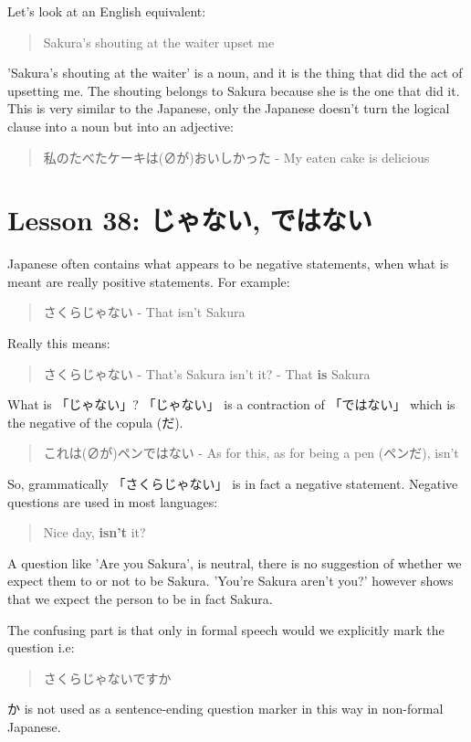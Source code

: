 \documentclass[11pt]{article}
\begin{document}
Let's look at an English equivalent:
\begin{quote}
Sakura's shouting at the waiter upset me
\end{quote}
'Sakura's shouting at the waiter' is a noun, and it is the thing that did the act of upsetting me. The shouting belongs to Sakura because she is the one that did it. This is very similar to the Japanese, only the Japanese doesn't turn the logical clause into a noun but into an adjective:
\begin{quote}
私のたべたケーキは(∅が)おいしかった - My eaten cake is delicious
\end{quote}

\section{Lesson 38: じゃない, ではない}
\label{sec:org830324f}
Japanese often contains what appears to be negative statements, when what is meant are really positive statements. For example:
\begin{quote}
さくらじゃない - That isn't Sakura
\end{quote}
Really this means:
\begin{quote}
さくらじゃない - That's Sakura isn't it? - That \textbf{is} Sakura
\end{quote}

What is 「じゃない」?  「じゃない」 is a contraction of 「ではない」 which is the negative of the copula (だ).
\begin{quote}
これは(∅が)ペンではない - As for this, as for being a pen (ペンだ), isn't
\end{quote}

So, grammatically 「さくらじゃない」 is in fact a negative statement. Negative questions are used in most languages:
\begin{quote}
Nice day, \textbf{isn't} it?
\end{quote}

A question like 'Are you Sakura', is neutral, there is no suggestion of whether we expect them to or not to be Sakura. 'You're Sakura aren't you?' however shows that we expect the person to be in fact Sakura.

The confusing part is that only in formal speech would we explicitly mark the question i.e:
\begin{quote}
さくらじゃないですか
\end{quote}
か is not used as a sentence-ending question marker in this way in non-formal Japanese.
\end{document}
